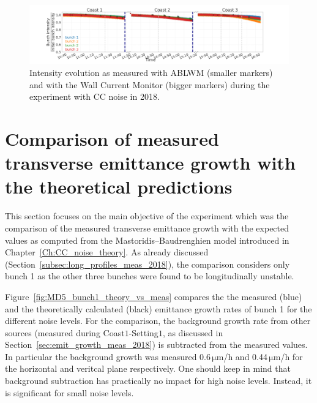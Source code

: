 \begin{figure}
   \centering
   \includegraphics[width=1.0\textwidth]{images/Ch5/MD5_overview_intensity_with_wall_current_monitor.png}
   \caption{Intensity evolution as measured with ABLWM (smaller markers) and with the Wall Current Monitor (bigger markers) during the experiment with CC noise in 2018.}
   \label{fig:MD5_overview_intensity}
\end{figure}

\section{Comparison of measured transverse emittance growth with the theoretical predictions}\label{sec:meas_2018_vs_theory}
This section focuses on the main objective of the experiment which was the comparison of the measured transverse emittance growth with the expected values as computed from the Mastoridis--Baudrenghien model introduced in Chapter~\ref{Ch:CC_noise_theory}. As already discussed (Section~\ref{subsec:long_profiles_meas_2018}), the comparison considers only bunch 1 as the other three bunches were found to be longitudinally unstable.

Figure~\ref{fig:MD5_bunch1_theory_vs_meas} compares the the measured (blue) and the theoretically calculated (black) emittance growth rates of bunch 1 for the different noise levels. For the comparison, the background growth rate from other sources (measured during Coast$1$-Setting$1$, as discussed in Section~\ref{sec:emit_growth_meas_2018}) is subtracted from the measured values. In particular the background growth was measured 0.6\,$\mathrm{\mu m}$/h and 0.44\,$\mathrm{\mu m}$/h for the horizontal and veritcal plane respectively. One should keep in mind that background subtraction has practically no impact for high noise levels. Instead, it is significant for small noise levels.


